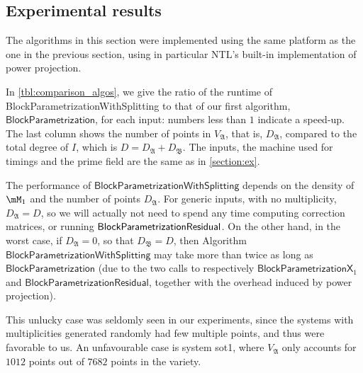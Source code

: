\documentclass[12pt]{article}
\newcommand{\mainalgoname}{\mathsf{ BlockParametrization}}
\begin{document}

\subsection{Experimental results}

The algorithms in this section were implemented using the same
platform as the one in the previous section, using in particular NTL's
built-in implementation of power projection.

In \cref{tbl:comparison_algos}, we give the ratio of the runtime of
{\sf Block\-Parametrization\-WithSplitting} to that of our first
algorithm, $\mainalgoname$, for each input: numbers less than $1$
indicate a speed-up.  The last column shows the number of points in
$V_\mathfrak{A}$, that is, $D_\mathfrak{A}$, compared to the total
degree of $I$, which is $D=D_\mathfrak{A}+D_\mathfrak{B}$. The inputs,
the machine used for timings and the prime field are the same as in
\cref{section:ex}.

The performance of $\mathsf{BlockParametrizationWithSplitting}$
depends on the density of $\mM_1$ and the number of points
$D_\mathfrak{A}$.  For generic inputs, with no multiplicity,
$D_\mathfrak{A}=D$, so we will actually not need to spend any time
computing correction matrices, or running $\mainalgoname{\sf
  Residual}$. On the other hand, in the worst case, if
$D_\mathfrak{A}=0$, so that $D_\mathfrak{B}=D$, then Algorithm
$\mathsf{BlockParametrizationWithSplitting}$ may take more than twice as
long as $\mainalgoname$ (due to the two calls to respectively
$\mathsf{BlockParametrizationX}_1$ and
$\mathsf{BlockParametrizationResidual}$, together with the overhead induced 
by power projection).

This unlucky case was seldomly seen in our experiments, since the
systems with multiplicities generated randomly had few multiple
points, and thus were favorable to us. An unfavourable case is system
sot1, where $V_\mathfrak{A}$ only accounts for $1012$ points out of
$7682$ points in the variety. 
\end{document}
